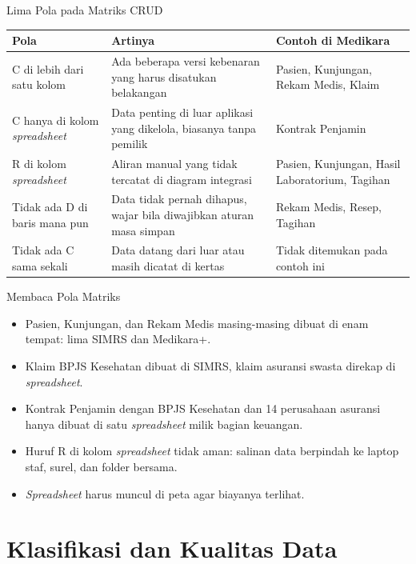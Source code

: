 \documentclass[aspectratio=169, table, 12pt]{beamer}
\begin{document}
\begin{frame}{{\Large Lima Pola pada Matriks CRUD}}
  \footnotesize
  \begin{tabularx}{\textwidth}{XXX}
    \hline
    \textbf{Pola} & \textbf{Artinya} & \textbf{Contoh di Medikara} \\
    \hline
    C di lebih dari satu kolom & Ada beberapa versi kebenaran yang harus
      disatukan belakangan & Pasien, Kunjungan, Rekam Medis, Klaim \\
    \hline
    C hanya di kolom \textit{spreadsheet} & Data penting di luar aplikasi yang
      dikelola, biasanya tanpa pemilik & Kontrak Penjamin \\
    \hline
    R di kolom \textit{spreadsheet} & Aliran manual yang tidak tercatat di
      diagram integrasi & Pasien, Kunjungan, Hasil Laboratorium, Tagihan \\
    \hline
    Tidak ada D di baris mana pun & Data tidak pernah dihapus, wajar bila
      diwajibkan aturan masa simpan & Rekam Medis, Resep, Tagihan \\
    \hline
    Tidak ada C sama sekali & Data datang dari luar atau masih dicatat di
      kertas & Tidak ditemukan pada contoh ini \\
    \hline
  \end{tabularx}
\end{frame}

\begin{frame}{{\Large Membaca Pola Matriks}}
  \vspace{6pt}
  \small
  \begin{itemize}
    \item Pasien, Kunjungan, dan Rekam Medis masing-masing dibuat di enam tempat: lima SIMRS dan Medikara+.
    \item Klaim BPJS Kesehatan dibuat di SIMRS, klaim asuransi swasta direkap di \textit{spreadsheet}.
    \item Kontrak Penjamin dengan BPJS Kesehatan dan 14 perusahaan asuransi hanya dibuat di satu
          \textit{spreadsheet} milik bagian keuangan.
    \item Huruf R di kolom \textit{spreadsheet} tidak aman: salinan data berpindah ke laptop staf, surel,
          dan folder bersama.
    \item \textit{Spreadsheet} harus muncul di peta agar biayanya terlihat.
  \end{itemize}
\end{frame}

\section{Klasifikasi dan Kualitas Data}
\end{document}
